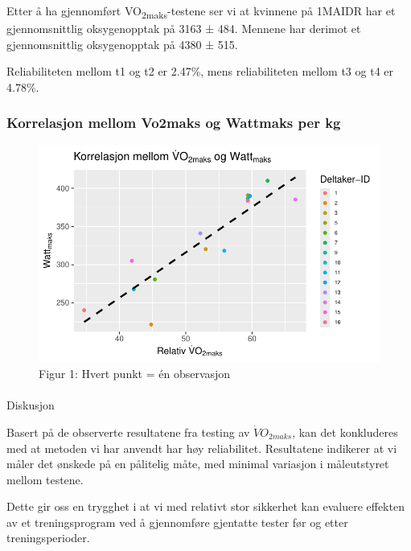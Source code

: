 \documentclass[
  letterpaper,
  DIV=11,
  numbers=noendperiod]{scrreprt}
\makeatletter
\let\oldparagraph\paragraph
\renewcommand{\paragraph}{
    \@ifstar
      \xxxParagraphStar
      \xxxParagraphNoStar
  }
\newcommand{\xxxParagraphStar}[1]{\oldparagraph*{#1}\mbox{}}
\newcommand{\xxxParagraphNoStar}[1]{\oldparagraph{#1}\mbox{}}
\makeatother
\begin{document}
Etter å ha gjennomført VO\textsubscript{2maks}-testene ser vi at
kvinnene på 1MAIDR har et gjennomsnittlig oksygenopptak på 3163 ± 484.
Mennene har derimot et gjennomsnittlig oksygenopptak på 4380 ± 515.

Reliabiliteten mellom t1 og t2 er 2.47\%, mens reliabiliteten mellom t3
og t4 er 4.78\%.

\subsubsection{Korrelasjon mellom Vo2maks og Wattmaks per
kg}\label{korrelasjon-mellom-vo2maks-og-wattmaks-per-kg}

\begin{figure}[H]

{\centering \includegraphics{01-reliabilitet_files/figure-pdf/unnamed-chunk-10-1.pdf}

}

\caption{Figur 1: Hvert punkt = én observasjon}

\end{figure}%

\paragraph{Diskusjon}\label{diskusjon}

Basert på de observerte resultatene fra testing av \(\dot{V}O_{2maks}\),
kan det konkluderes med at metoden vi har anvendt har høy reliabilitet.
Resultatene indikerer at vi måler det ønskede på en pålitelig måte, med
minimal variasjon i måleutstyret mellom testene.

Dette gir oss en trygghet i at vi med relativt stor sikkerhet kan
evaluere effekten av et treningsprogram ved å gjennomføre gjentatte
tester før og etter treningsperioder.
\end{document}
